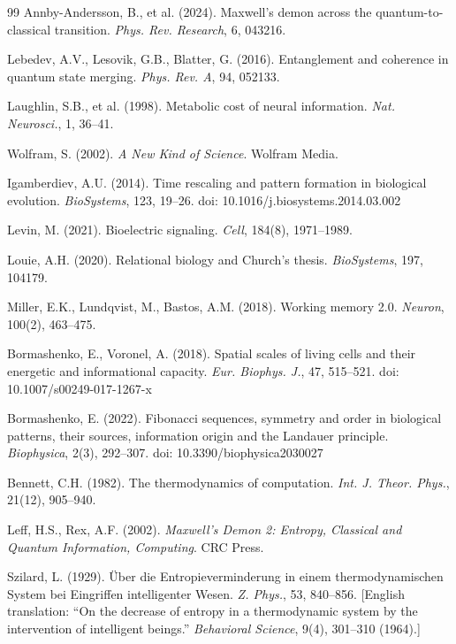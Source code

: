 \documentclass[12pt]{article}
\numberwithin{equation}{section}
\begin{document}
\begin{thebibliography}{99}
Annby-Andersson, B., et al. (2024). Maxwell's demon across the quantum-to-classical transition. \textit{Phys. Rev. Research}, 6, 043216.

Lebedev, A.V., Lesovik, G.B., Blatter, G. (2016). Entanglement and coherence in quantum state merging. \textit{Phys. Rev. A}, 94, 052133.

Laughlin, S.B., et al. (1998). Metabolic cost of neural information. \textit{Nat. Neurosci.}, 1, 36--41.

Wolfram, S. (2002). \textit{A New Kind of Science}. Wolfram Media.

Igamberdiev, A.U. (2014). Time rescaling and pattern formation in biological evolution. \textit{BioSystems}, 123, 19--26. doi: 10.1016/j.biosystems.2014.03.002

Levin, M. (2021). Bioelectric signaling. \textit{Cell}, 184(8), 1971--1989.

Louie, A.H. (2020). Relational biology and Church's thesis. \textit{BioSystems}, 197, 104179.

Miller, E.K., Lundqvist, M., Bastos, A.M. (2018). Working memory 2.0. \textit{Neuron}, 100(2), 463--475.

Bormashenko, E., Voronel, A. (2018). Spatial scales of living cells and their energetic and informational capacity. \textit{Eur. Biophys. J.}, 47, 515--521. doi: 10.1007/s00249-017-1267-x

Bormashenko, E. (2022). Fibonacci sequences, symmetry and order in biological patterns, their sources, information origin and the Landauer principle. \textit{Biophysica}, 2(3), 292--307. doi: 10.3390/biophysica2030027

Bennett, C.H. (1982). The thermodynamics of computation. \textit{Int. J. Theor. Phys.}, 21(12), 905--940.

Leff, H.S., Rex, A.F. (2002). \textit{Maxwell's Demon 2: Entropy, Classical and Quantum Information, Computing}. CRC Press.

Szilard, L. (1929). Über die Entropieverminderung in einem thermodynamischen System bei Eingriffen intelligenter Wesen. \textit{Z. Phys.}, 53, 840--856. [English translation: ``On the decrease of entropy in a thermodynamic system by the intervention of intelligent beings.'' \textit{Behavioral Science}, 9(4), 301--310 (1964).]


\end{thebibliography}
\end{document}
